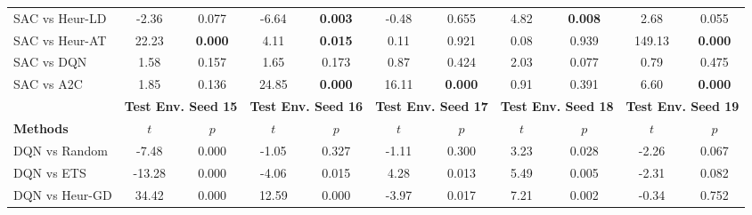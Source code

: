 \begin{tabular}{lcccccccccc}
	SAC vs Heur-LD   & -2.36           & 0.077                 & -6.64          & \textbf{0.003}         & -0.48          & 0.655                  & 4.82           & \textbf{0.008}         & 2.68           & 0.055                  \\
	SAC vs Heur-AT   & 22.23           & \textbf{0.000}        & 4.11           & \textbf{0.015}         & 0.11           & 0.921                  & 0.08           & 0.939                  & 149.13         & \textbf{0.000}         \\
	SAC vs DQN       & 1.58            & 0.157                 & 1.65           & 0.173                  & 0.87           & 0.424                  & 2.03           & 0.077                  & 0.79           & 0.475                  \\
	SAC vs A2C       & 1.85            & 0.136                 & 24.85          & \textbf{0.000}         & 16.11          & \textbf{0.000}         & 0.91           & 0.391                  & 6.60           & \textbf{0.000}         \\
	\midrule 
	& \multicolumn{2}{c}{\textbf{Test Env. Seed 15}} & \multicolumn{2}{c}{\textbf{Test Env. Seed 16}} & \multicolumn{2}{c}{\textbf{Test Env. Seed 17}} & \multicolumn{2}{c}{\textbf{Test Env. Seed 18}} & \multicolumn{2}{c}{\textbf{Test Env. Seed 19}} \\
	\cmidrule(lr){2-3} \cmidrule(lr){4-5} \cmidrule(lr){6-7} \cmidrule(lr){8-9} \cmidrule(lr){10-11}
	\textbf{Methods} &$t$                &$p$                         &$t$               &$p$                          &$t$               &$p$                          &$t$               &$p$                          &$t$               &$p$                          \\ 
	\midrule 
	DQN vs Random    & -7.48           & 0.000                 & -1.05          & 0.327                  & -1.11          & 0.300                  & 3.23           & 0.028                  & -2.26          & 0.067                  \\
	DQN vs ETS       & -13.28          & 0.000                 & -4.06          & 0.015                  & 4.28           & 0.013                  & 5.49           & 0.005                  & -2.31          & 0.082                  \\
	DQN vs Heur-GD   & 34.42           & 0.000                 & 12.59          & 0.000                  & -3.97          & 0.017                  & 7.21           & 0.002                  & -0.34          & 0.752                  \\

\end{tabular}
